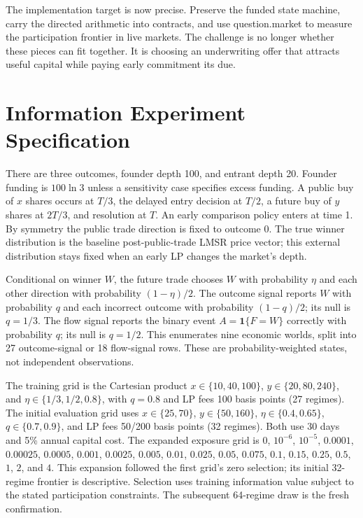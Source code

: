 \documentclass[10pt]{article}
\begin{document}
The implementation target is now precise. Preserve the funded state machine, carry the directed arithmetic into contracts, and use question.market to measure the participation frontier in live markets. The challenge is no longer whether these pieces can fit together. It is choosing an underwriting offer that attracts useful capital while paying early commitment its due.

\appendix

\section{Information Experiment Specification}

There are three outcomes, founder depth 100, and entrant depth 20. Founder funding is $100\ln3$ unless a sensitivity case specifies excess funding. A public buy of $x$ shares occurs at $T/3$, the delayed entry decision at $T/2$, a future buy of $y$ shares at $2T/3$, and resolution at $T$. An early comparison policy enters at time 1. By symmetry the public trade direction is fixed to outcome 0. The true winner distribution is the baseline post-public-trade LMSR price vector; this external distribution stays fixed when an early LP changes the market's depth.

Conditional on winner $W$, the future trade chooses $W$ with probability $\eta$ and each other direction with probability $(1-\eta)/2$. The outcome signal reports $W$ with probability $q$ and each incorrect outcome with probability $(1-q)/2$; its null is $q=1/3$. The flow signal reports the binary event $A=\mathbf1\{F=W\}$ correctly with probability $q$; its null is $q=1/2$. This enumerates nine economic worlds, split into 27 outcome-signal or 18 flow-signal rows. These are probability-weighted states, not independent observations.

The training grid is the Cartesian product $x\in\{10,40,100\}$, $y\in\{20,80,240\}$, and $\eta\in\{1/3,1/2,0.8\}$, with $q=0.8$ and LP fees 100 basis points (27 regimes). The initial evaluation grid uses $x\in\{25,70\}$, $y\in\{50,160\}$, $\eta\in\{0.4,0.65\}$, $q\in\{0.7,0.9\}$, and LP fees 50/200 basis points (32 regimes). Both use 30 days and 5\% annual capital cost. The expanded exposure grid is $0$, $10^{-6}$, $10^{-5}$, $0.0001$, $0.00025$, $0.0005$, $0.001$, $0.0025$, $0.005$, $0.01$, $0.025$, $0.05$, $0.075$, $0.1$, $0.15$, $0.25$, $0.5$, $1$, $2$, and $4$. This expansion followed the first grid's zero selection; its initial 32-regime frontier is descriptive. Selection uses training information value subject to the stated participation constraints. The subsequent 64-regime draw is the fresh confirmation.
\end{document}
